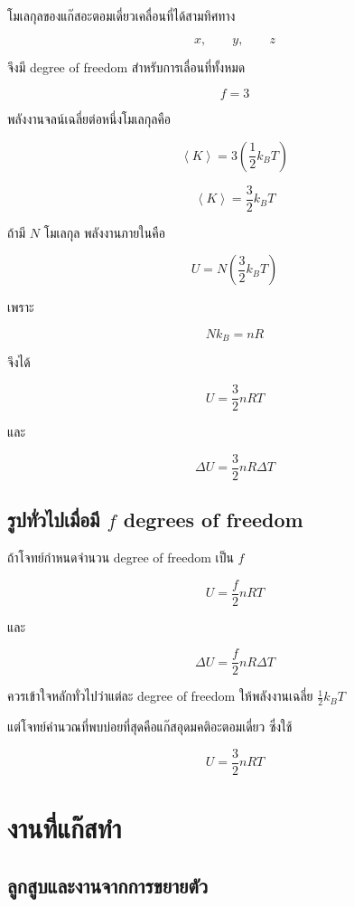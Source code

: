 โมเลกุลของแก๊สอะตอมเดี่ยวเคลื่อนที่ได้สามทิศทาง

\[
x,
\qquad
y,
\qquad
z
\]

จึงมี degree of freedom สำหรับการเลื่อนที่ทั้งหมด

\[
f=3
\]

พลังงานจลน์เฉลี่ยต่อหนึ่งโมเลกุลคือ

\[
\left\langle K\right\rangle
=
3\left(\frac{1}{2}k_BT\right)
\]

\[
\boxed{
\left\langle K\right\rangle
=
\frac{3}{2}k_BT
}
\]

ถ้ามี $N$ โมเลกุล พลังงานภายในคือ

\[
U
=
N\left(\frac{3}{2}k_BT\right)
\]

เพราะ

\[
Nk_B=nR
\]

จึงได้

\[
\boxed{
U
=
\frac{3}{2}nRT
}
\]

และ

\[
\boxed{
\Delta U
=
\frac{3}{2}nR\Delta T
}
\]

\subsection{รูปทั่วไปเมื่อมี $f$ degrees of freedom}

ถ้าโจทย์กำหนดจำนวน degree of freedom เป็น $f$

\[
\boxed{
U
=
\frac{f}{2}nRT
}
\]

และ

\[
\boxed{
\Delta U
=
\frac{f}{2}nR\Delta T
}
\]

\begin{tcolorbox}[title=ขอบเขตสำหรับข้อสอบคัดเลือก]
ควรเข้าใจหลักทั่วไปว่าแต่ละ degree of freedom ให้พลังงานเฉลี่ย $\frac{1}{2}k_BT$

แต่โจทย์คำนวณที่พบบ่อยที่สุดคือแก๊สอุดมคติอะตอมเดี่ยว ซึ่งใช้

\[
U=\frac{3}{2}nRT
\]
\end{tcolorbox}

\section{งานที่แก๊สทำ}

\subsection{ลูกสูบและงานจากการขยายตัว}

